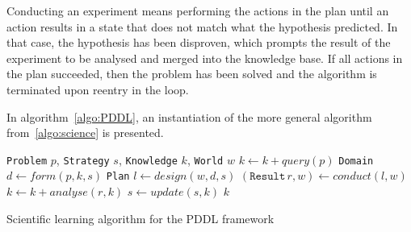 \documentclass[../Master.tex]{subfiles}
\begin{document}
Conducting an experiment means performing the actions in the plan until an action results in a state that does not match what the hypothesis predicted. In that case, the hypothesis has been disproven, which prompts the result of the experiment to be analysed and merged into the knowledge base. If all actions in the plan succeeded, then the problem has been solved and the algorithm is terminated upon reentry in the loop.

In algorithm~\ref{algo:PDDL}, an instantiation of the more general algorithm from~\ref{algo:science} is presented.

\begin{algorithm}
    \begin{algorithmic}
         {\texttt{Problem} $p$, \texttt{Strategy} $s$, \texttt{Knowledge} $k$, \texttt{World} $w$}
                \State $k \gets k + query(p)$
                \State \texttt{Domain} $d \gets form(p, k, s)$
                \State \texttt{Plan} $l \gets design(w, d, s)$
                \State $(\texttt{Result} \, r, w) \gets conduct(l, w)$
                \State $k \gets k + analyse(r, k)$
                \State $s \gets update(s, k)$
            \EndWhile
            \State \Return $k$
        \EndFunction
    \end{algorithmic}
    \caption{Scientific learning algorithm for the PDDL framework}\label{algo:PDDL}
\end{algorithm}
\end{document}
